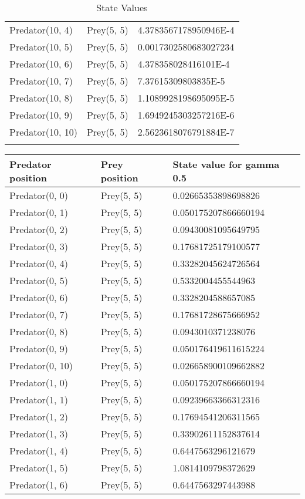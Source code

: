 \begin{longtable}{| p{} | p{} | p{} |}
Predator(10, 4) & Prey(5, 5) &4.3783567178950946E-4\\
Predator(10, 5) & Prey(5, 5) &0.0017302580683027234\\
Predator(10, 6) & Prey(5, 5) &4.378358028416101E-4\\
Predator(10, 7) & Prey(5, 5) &7.37615309803835E-5\\
Predator(10, 8) & Prey(5, 5) &1.1089928198695095E-5\\
Predator(10, 9) & Prey(5, 5) &1.6949245303257216E-6\\
Predator(10, 10) & Prey(5, 5) &2.5623618076791884E-7\\
\caption{State Values} 
\label{tab:myfirstlongtable}
\end{longtable}

\begin{longtable}{| p{} | p{} | p{} |} 
   Predator position & Prey position & State value for gamma 0.5 \\
    \hline
Predator(0, 0) & Prey(5, 5) &0.02665353898698826\\
Predator(0, 1) & Prey(5, 5) &0.050175207866660194\\
Predator(0, 2) & Prey(5, 5) &0.09430081095649795\\
Predator(0, 3) & Prey(5, 5) &0.17681725179100577\\
Predator(0, 4) & Prey(5, 5) &0.33282045624726564\\
Predator(0, 5) & Prey(5, 5) &0.5332004455544963\\
Predator(0, 6) & Prey(5, 5) &0.3328204588657085\\
Predator(0, 7) & Prey(5, 5) &0.17681728675666952\\
Predator(0, 8) & Prey(5, 5) &0.0943010371238076\\
Predator(0, 9) & Prey(5, 5) &0.050176419611615224\\
Predator(0, 10) & Prey(5, 5) &0.026658900109662882\\
Predator(1, 0) & Prey(5, 5) &0.050175207866660194\\
Predator(1, 1) & Prey(5, 5) &0.09239663366312316\\
Predator(1, 2) & Prey(5, 5) &0.17694541206311565\\
Predator(1, 3) & Prey(5, 5) &0.33902611152837614\\
Predator(1, 4) & Prey(5, 5) &0.6447563296121679\\
Predator(1, 5) & Prey(5, 5) &1.0814109798372629\\
Predator(1, 6) & Prey(5, 5) &0.6447563297443988\\

\end{longtable}
